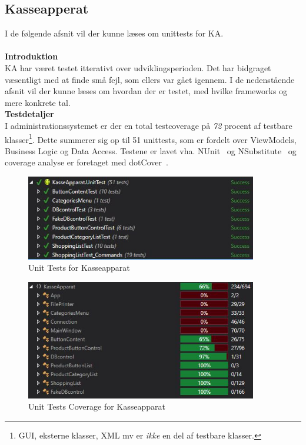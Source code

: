 \subsection{Kasseapperat}
I de følgende afsnit vil der kunne læses om unittests for \gls{KA}.\\\\

\textbf{Introduktion}\\
\gls{KA} har været testet itterativt over udviklingsperioden. Det har bidgraget
væsentligt med at finde små fejl, som ellers var gået igennem. I de nedenstående afsnit vil der
kunne læses om hvordan der er testet, med hvilke frameworks og mere konkrete tal.\\

\textbf{Testdetaljer}\\
I administrationssystemet er der en total testcoverage på \textit{72} procent af testbare klasser\footnote{GUI, eksterne klasser, XML mv er \textit{ikke} en del af testbare klasser.}. Dette summerer sig op til 51 unittests, som er fordelt over ViewModels, Business Logic og Data Access. Testene er lavet
vha. NUnit~\cite{NUnit} og NSubstitute~\cite{NSubstitute} og coverage analyse er foretaget med dotCover~\cite{dotCover}.

\begin{figure}[H]
	\centering
	\includegraphics[width=0.90\textwidth]{Test/Images/Frontend/UnitTests}
	\caption{Unit Tests for Kasseapparat}
	\label{fig:UTKA}
\end{figure}

\begin{figure}[H]
	\centering
	\includegraphics[width=0.90\textwidth]{Test/Images/Frontend/UnitTestCover}
	\caption{Unit Tests Coverage for Kasseapparat}
	\label{fig:UTCKA}
\end{figure}

